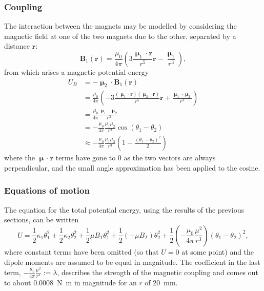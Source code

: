 \documentclass{article}
\begin{document}
\subsubsection{Coupling}
The interaction between the magnets may be modelled by considering the magnetic field at one of the two magnets due to the other, separated by a distance $\mathbf{r}$:
\begin{equation*}
    \mathbf{B}_1(\mathbf{r}) = \frac{\mu_0}{4\pi}\left( 3\frac{\bm{\upmu}_1\cdot\mathbf{r}}{r^5}\mathbf{r} - \frac{\bm{\upmu}_1}{r^3} \right),
\end{equation*}
from which arises a magnetic potential energy
\begin{equation*}
    \begin{aligned}
        U_B &= -\bm{\upmu}_2\cdot \mathbf{B}_1(\mathbf{r}) \\
            &= \frac{\mu_0}{4\pi}\left( -3\frac{(\bm{\upmu}_1\cdot\mathbf{r})(\bm{\upmu}_2\cdot\mathbf{r})}{r^5}\mathbf{r} + \frac{\bm{\upmu}_1\cdot\bm{\upmu}_2}{r^3} \right) \\
            &= \frac{\mu_0}{4\pi}\frac{\bm{\upmu}_1\cdot\bm{\upmu}_2}{r^3} \\
            &= -\frac{\mu_0}{4\pi}\frac{\mu_1\mu_2}{r^3}\cos(\theta_1 - \theta_2) \\
            &\approx -\frac{\mu_0}{4\pi}\frac{\mu_1\mu_2}{r^3} \left( 1 - \frac{(\theta_1 - \theta_2)^2}{2} \right)
    \end{aligned}
\end{equation*}
where the $\bm{\upmu}\cdot \mathbf{r}$ terms have gone to 0 as the two vectors are always perpendicular, and the small angle approximation has been applied to the cosine.

\subsubsection{Equations of motion}
The equation for the total potential energy, using the results of the previous sections, can be written
\begin{equation*}
    U = \frac{1}{2}\kappa_1\theta_1^2 + \frac{1}{2}\kappa_2\theta_2^2+ \frac{1}{2}\mu B_T\theta_1^2 + \frac{1}{2}\left( -\mu B_T \right)\theta_2^2 + \frac{1}{2}\left( -\frac{\mu_0}{4\pi}\frac{\mu^2}{r^3} \right)\left( \theta_1 - \theta_2 \right)^2,
\end{equation*}
where constant terms have been omitted (so that $U=0$ at some point) and the dipole moments are assumed to be equal in magnitude.
The coefficient in the last term, $-\frac{\mu_0}{4\pi}\frac{\mu^2}{r^3} := \lambda$, describes the strength of the magnetic coupling and comes out to about \qty{0.0008}{N.m} in magnitude for an $r$ of \qty{20}{mm}.
\end{document}
